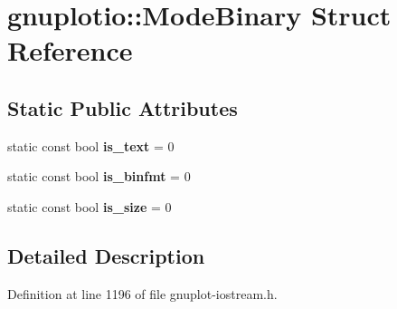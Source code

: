 \hypertarget{structgnuplotio_1_1_mode_binary}{}\section{gnuplotio\+:\+:Mode\+Binary Struct Reference}
\label{structgnuplotio_1_1_mode_binary}
\subsection*{Static Public Attributes}
\begin{DoxyCompactItemize}
\item 
static const bool {\bfseries is\+\_\+text} = 0\hypertarget{structgnuplotio_1_1_mode_binary_ac89064b5df24f7ef4d765fdfde4fd1b6}{}\label{structgnuplotio_1_1_mode_binary_ac89064b5df24f7ef4d765fdfde4fd1b6}

\item 
static const bool {\bfseries is\+\_\+binfmt} = 0\hypertarget{structgnuplotio_1_1_mode_binary_aee724034dc3372b8e12b1187507bf136}{}\label{structgnuplotio_1_1_mode_binary_aee724034dc3372b8e12b1187507bf136}

\item 
static const bool {\bfseries is\+\_\+size} = 0\hypertarget{structgnuplotio_1_1_mode_binary_a6eae25ea662362bbb88bc987d6025290}{}\label{structgnuplotio_1_1_mode_binary_a6eae25ea662362bbb88bc987d6025290}

\end{DoxyCompactItemize}


\subsection{Detailed Description}


Definition at line 1196 of file gnuplot-\/iostream.\+h.

